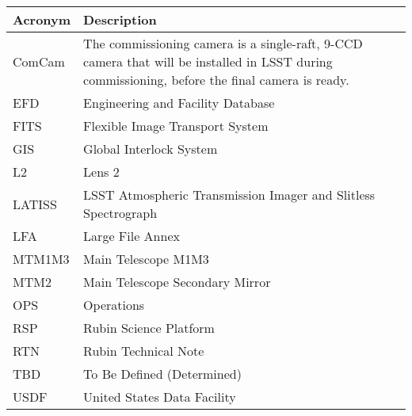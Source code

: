 \addtocounter{table}{-1}
\begin{longtable}{p{}p{}}\hline
\textbf{Acronym} & \textbf{Description}  \\\hline

ComCam & The commissioning camera is a single-raft, 9-CCD camera that will be installed in LSST during commissioning, before the final camera is ready. \\\hline
EFD & Engineering and Facility Database \\\hline
FITS & Flexible Image Transport System \\\hline
GIS & Global Interlock System \\\hline
L2 & Lens 2 \\\hline
LATISS & LSST Atmospheric Transmission Imager and Slitless Spectrograph \\\hline
LFA & Large File Annex \\\hline
MTM1M3 & Main Telescope M1M3 \\\hline
MTM2 & Main Telescope Secondary Mirror \\\hline
OPS & Operations \\\hline
RSP & Rubin Science Platform \\\hline
RTN & Rubin Technical Note \\\hline
TBD & To Be Defined (Determined) \\\hline
USDF & United States Data Facility \\\hline
\end{longtable}
